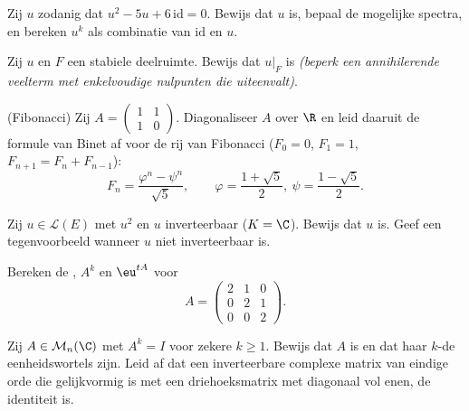 \begin{exercise}[$\star$]\label{exo:b2:reduction:3}
Zij $u$ zodanig dat $u^2 - 5u + 6\,\mathrm{id} = 0$. Bewijs dat $u$
 is, bepaal de mogelijke spectra, en bereken $u^k$
als combinatie van $\mathrm{id}$ en $u$.
\end{exercise}

\begin{exercise}[$\star\star$]\label{exo:b2:reduction:4}
Zij $u$  en $F$ een stabiele deelruimte. Bewijs
dat $u|_F$  is \emph{(beperk een annihilerende
veelterm met enkelvoudige nulpunten die uiteenvalt)}.
\end{exercise}

\begin{exercise}[$\star\star$]\label{exo:b2:reduction:5}
(Fibonacci) Zij $A = \begin{pmatrix} 1 & 1\\ 1 & 0\end{pmatrix}$.
Diagonaliseer $A$ over $\R$ en leid daaruit de formule van Binet af
voor de rij van Fibonacci ($F_0 = 0$, $F_1 = 1$, $F_{n+1} = F_n +
F_{n-1}$):
\[
F_n = \frac{\varphi^n - \psi^n}{\sqrt 5},
\qquad \varphi = \frac{1 + \sqrt5}{2},\ \psi = \frac{1 -
\sqrt5}{2}.
\]
\end{exercise}

\begin{exercise}[$\star\star$]\label{exo:b2:reduction:6}
Zij $u \in \mathcal{L}(E)$ met $u^2$  en $u$
inverteerbaar ($K = \C$). Bewijs dat $u$  is. Geef
een tegenvoorbeeld wanneer $u$ niet inverteerbaar is.
\end{exercise}

\begin{exercise}[$\star\star$]\label{exo:b2:reduction:7}
Bereken de , $A^k$ en $\eu^{tA}$ voor
\[
A = \begin{pmatrix} 2 & 1 & 0\\ 0 & 2 & 1\\ 0 & 0 & 2
\end{pmatrix}.
\]
\end{exercise}

\begin{exercise}[$\star\star$]\label{exo:b2:reduction:8}
Zij $A \in \mathcal{M}_n(\C)$ met $A^k = I$ voor zekere $k \geq 1$.
Bewijs dat $A$  is en dat haar 
$k$-de eenheidswortels zijn. Leid af dat een inverteerbare complexe
matrix van eindige orde die gelijkvormig is met een driehoeksmatrix
met diagonaal vol enen, de identiteit is.
\end{exercise}


